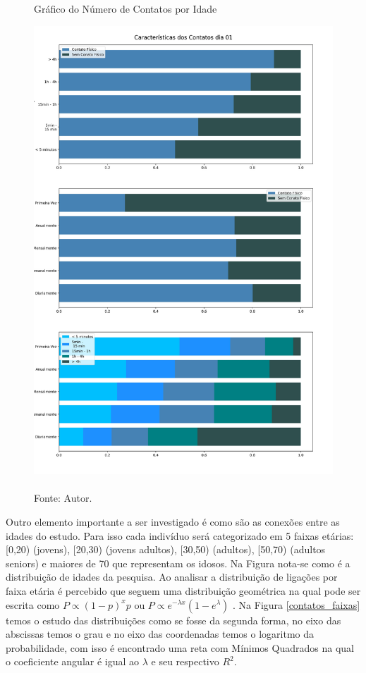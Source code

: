 \begin{figure}[H]
  \centering
  \captionsetup{font=normalsize,skip=1pt,singlelinecheck=on,labelsep=endash}

  \caption{Gráfico do Número de Contatos por Idade}

  \includegraphics[scale=0.5]{./img/contatos01.jpg}
  \captionsetup{font=small,position=below,skip=-1pt}
   \caption*{\\Fonte: Autor.}
   \label{características}
\end{figure}

Outro elemento importante a ser investigado é como são as conexões entre as idades do estudo. Para isso cada indivíduo será categorizado em 5 faixas etárias: [0,20) (jovens), [20,30) (jovens adultos), [30,50) (adultos), [50,70)  (adultos seniors) e maiores de 70 que representam os idosos. Na Figura  nota-se como é a distribuição de idades da pesquisa. Ao analisar a distribuição de ligações por faixa etária é percebido que seguem uma distribuição geométrica na qual pode ser escrita como $P \propto (1 - p)^xp$ ou $P \propto e^{-\lambda x}(1 - e^\lambda)$ . Na Figura \ref{contatos_faixas} temos o estudo das distribuições como se fosse da segunda forma, no eixo das abscissas temos o grau e no eixo das coordenadas temos o logaritmo da probabilidade, com isso é encontrado uma reta com Mínimos Quadrados na qual o coeficiente angular é igual ao $\lambda$ e seu respectivo $R^2$.

